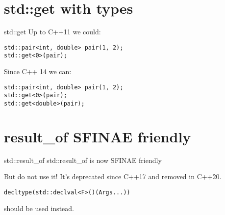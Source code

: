 \documentclass[10pt]{beamer}
\begin{document}
\section{std::get with types}
\begin{frame}[fragile]{std::get}
	Up to C++11 we could:

	\begin{verbatim}
std::pair<int, double> pair(1, 2);
std::get<0>(pair);
	\end{verbatim}

\vfill
\pause
    Since C++ 14 we can:

	\begin{verbatim}
std::pair<int, double> pair(1, 2);
std::get<0>(pair);
std::get<double>(pair);
	\end{verbatim}

\end{frame}

\section{result\_of SFINAE friendly}
\begin{frame}[fragile]{std::result\_of}
	\centering std::result\_of is now SFINAE friendly
	\pause

	But do not use it! It's deprecated since C++17 and \alert{removed in C++20}.\\
	
	\vfill

	\begin{verbatim}
decltype(std::declval<F>()(Args...))
	\end{verbatim}
	should be used instead.
\end{frame}
\end{document}
